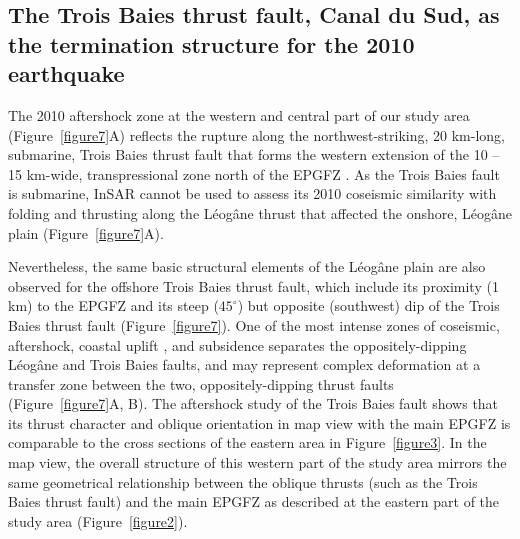 \documentclass[linenumbers,draft]{agujournal}
\begin{document}
\subsection{The Trois Baies thrust fault, Canal du Sud, as the termination structure for the 2010 earthquake}
The 2010 aftershock zone at the western and central part of our study area (Figure~\ref{figure7}A) reflects the rupture along the northwest-striking, 20 km-long, submarine, Trois Baies thrust fault that forms the western extension of the 10 -- 15 km-wide, transpressional zone north of the EPGFZ \citep{mercier20112010}. As the Trois Baies fault is submarine, InSAR cannot be used to assess its 2010 coseismic similarity with folding and thrusting along the L\'eog\^ane thrust that affected the onshore, L\'eog\^ane plain (Figure~\ref{figure7}A). 

Nevertheless, the same basic structural elements of the L\'eog\^ane plain are also observed for the offshore Trois Baies thrust fault, which include its proximity (1 km) to the EPGFZ and its steep ($45^{\circ}$) but opposite (southwest) dip of the Trois Baies thrust fault (Figure~\ref{figure7}). One of the most intense zones of coseismic, aftershock, coastal uplift \citep{hashimoto2011fan}, and subsidence \citep{prentice2010seismic} separates the oppositely-dipping L\'eog\^ane and Trois Baies faults, and may represent complex deformation at a transfer zone between the two, oppositely-dipping thrust faults (Figure~\ref{figure7}A, B). The aftershock study of the Trois Baies fault \citep{symithe2016present} shows that its thrust character and oblique orientation in map view with the main EPGFZ is comparable to the cross sections of the eastern area in Figure~\ref{figure3}. In the map view, the overall structure of this western part of the study area mirrors the same geometrical relationship between the oblique thrusts (such as the Trois Baies thrust fault) and the main EPGFZ as described at the eastern part of the study area (Figure~\ref{figure2}).
\end{document}
